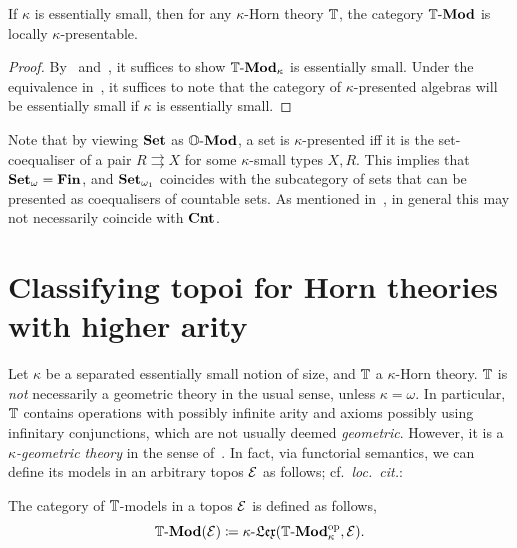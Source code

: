\begin{theorem}\label{thm:hornmodelpresentable}
  If $\kappa$ is essentially small, then for any $\kappa$-Horn theory $\mathbb{T}$, the category $\mathbb{T}\text{-}\mathbf{Mod}$ is locally $\kappa$-presentable.
\end{theorem}
\begin{proof}
  By~ and~, it suffices to show $\mathbb{T}\text{-}\mathbf{Mod}_\kappa$ is essentially small. Under the equivalence in~, it suffices to note that the category of $\kappa$-presented algebras will be essentially small if $\kappa$ is essentially small.
\end{proof}

\begin{example}\label{exa:presentableobjectsinset}
  Note that by viewing $\mathbf{Set}$ as $\mathbb{O}\text{-}\mathbf{Mod}$, a set is $\kappa$-presented iff it is the set-coequaliser of a pair $R \rightrightarrows X$ for some $\kappa$-small types $X,R$. This implies that $\mathbf{Set}_{\omega} = \mathbf{Fin}$, and $\mathbf{Set}_{\omega_1}$ coincides with the subcategory of sets that can be presented as coequalisers of countable sets. As mentioned in~, in general this may not necessarily coincide with $\mathbf{Cnt}$.
\end{example}




\section{Classifying topoi for Horn theories with higher arity}\label{sec:classifyingtopforhorn}


Let $\kappa$ be a separated essentially small notion of size, and $\mathbb{T}$ a $\kappa$-Horn theory. $\mathbb{T}$ is \emph{not} necessarily a geometric theory in the usual sense, unless $\kappa = \omega$. In particular, $\mathbb{T}$ contains operations with possibly infinite arity and axioms possibly using infinitary conjunctions, which are not usually deemed \emph{geometric}. However, it is a \emph{$\kappa$-geometric theory} in the sense of~\citet[\S8.3]{makkai1977first}. In fact, via functorial semantics, we can define its models in an arbitrary topos $\mathcal{E}$ as follows; cf.\ \emph{loc.\ cit.}:

\begin{definition}\label{def:algebraintopos}
  The category of $\mathbb{T}$-models in a topos $\mathcal{E}$ is defined as follows,
  \[ \mathbb{T}\text{-}\mathbf{Mod}(\mathcal{E}) \coloneq \kappa\text{-}\mathfrak{Lex}(\mathbb{T}\text{-}\mathbf{Mod}_\kappa^{\mathrm{op}},\mathcal{E}). \]
\end{definition}


